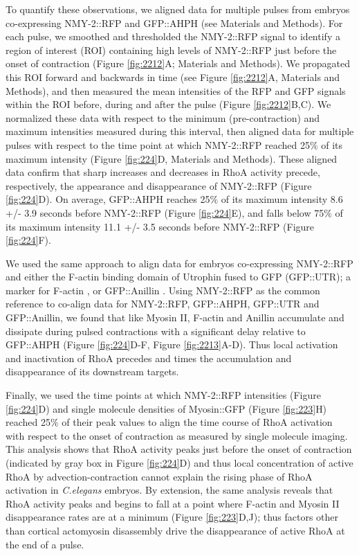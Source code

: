 To quantify these observations, we aligned data for multiple pulses from embryos co-expressing NMY-2::RFP and GFP::AHPH (see Materials and Methods). For each pulse, we smoothed and thresholded the NMY-2::RFP signal to identify a region of interest (ROI) containing high levels of NMY-2::RFP just before the onset of contraction (Figure \ref{fig:2212}A; Materials and Methods). We propagated this ROI forward and backwards in time (see Figure \ref{fig:2212}A, Materials and Methods), and then measured the mean intensities of the RFP and GFP signals within the ROI before, during and after the pulse (Figure \ref{fig:2212}B,C). We normalized these data with respect to the minimum (pre-contraction) and maximum intensities measured during this interval, then aligned data for multiple pulses with respect to the time point at which NMY-2::RFP reached 25$\%$ of its maximum intensity (Figure \ref{fig:224}D, Materials and Methods). These aligned data confirm that sharp increases and decreases in RhoA activity precede, respectively, the appearance and disappearance of NMY-2::RFP (Figure \ref{fig:224}D).  On average, GFP::AHPH reaches 25$\%$ of its maximum intensity 8.6 +/- 3.9 seconds before NMY-2::RFP (Figure \ref{fig:224}E), and falls below 75$\%$ of its maximum intensity 11.1 +/- 3.5 seconds before NMY-2::RFP (Figure \ref{fig:224}F).

We used the same approach to align data for embryos co-expressing NMY-2::RFP and either the F-actin binding domain of Utrophin fused to GFP (GFP::UTR); a marker for F-actin \cite{Burkel:2007fj,Tse:2012fp}, or GFP::Anillin \cite{Maddox:2007cx}. Using NMY-2::RFP as the common reference to co-align data for NMY-2::RFP, GFP::AHPH, GFP::UTR and GFP::Anillin, we found that like Myosin II, F-actin and Anillin accumulate and dissipate during pulsed contractions with a significant delay relative to GFP::AHPH (Figure \ref{fig:224}D-F, Figure \ref{fig:2213}A-D). Thus local activation and inactivation of RhoA precedes and times the accumulation and disappearance of its downstream targets. 

Finally, we used the time points at which NMY-2::RFP intensities (Figure \ref{fig:224}D) and single molecule densities of Myosin::GFP (Figure \ref{fig:223}H) reached 25$\%$ of their peak values to align the time course of RhoA activation with respect to the onset of contraction as measured by single molecule imaging.  This analysis shows that RhoA activity peaks just before the onset of contraction (indicated by gray box in Figure \ref{fig:224}D) and thus local concentration of active RhoA by advection-contraction \cite{Munjal:2015bx} cannot explain the rising phase of RhoA activation in \textit{C.elegans} embryos.  By extension, the same analysis reveals that RhoA activity peaks and begins to fall at a point where F-actin and Myosin II disappearance rates are at a minimum (Figure \ref{fig:223}D,J); thus factors other than cortical actomyosin disassembly drive the disappearance of active RhoA at the end of a pulse.

